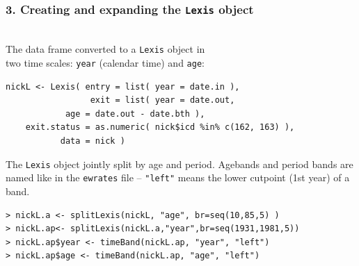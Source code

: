 \documentclass[handout,12pt]{beamer}
\begin{document}
\begin{frame}[fragile] 
\frametitle{3. Creating and expanding the \texttt{Lexis} object}

\ \\
The data frame converted to a \texttt{Lexis} object in \\
two time scales: \texttt{year} (calendar time) and \texttt{age}: 

{\small 
\renewcommand{\baselinestretch}{0.9}  
\begin{verbatim}  
nickL <- Lexis( entry = list( year = date.in ),
                 exit = list( year = date.out, 
            age = date.out - date.bth ),
    exit.status = as.numeric( nick$icd %in% c(162, 163) ),
           data = nick )
\end{verbatim}
}
The \texttt{Lexis} object jointly split by age and period. Agebands and period bands are named like in the \texttt{ewrates} file --
\texttt{"left"} means the lower cutpoint (1st year) of a band.
\small
\begin{verbatim}
> nickL.a <- splitLexis(nickL, "age", br=seq(10,85,5) )
> nickL.ap<- splitLexis(nickL.a,"year",br=seq(1931,1981,5))
> nickL.ap$year <- timeBand(nickL.ap, "year", "left")
> nickL.ap$age <- timeBand(nickL.ap, "age", "left")
\end{verbatim}  
\renewcommand{\baselinestretch}{1.0} 

\end{frame}
\end{document}
